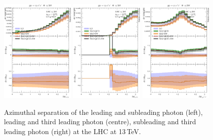 \begin{figure}[t!]
  \centering
  \includegraphics[width=0.32\textwidth]{figs_aaz/dphi_y1_y2}
  \includegraphics[width=0.32\textwidth]{figs_aaz/dphi_y1_l1l2}
  \includegraphics[width=0.32\textwidth]{figs_aaz/dphi_y2_l1l2}
  \caption{
    Azimuthal separation of the leading and subleading photon (left),
    leading and third leading photon (centre), subleading and third leading 
    photon (right) at the LHC at 13\,TeV.\\
    \label{fig:aaz:dphi}
  }
\end{figure}



